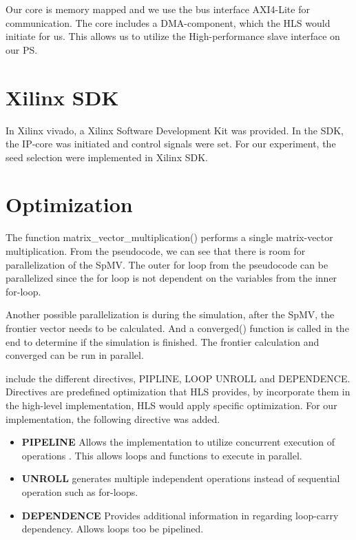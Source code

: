 Our core is memory mapped and we use the bus interface AXI4-Lite for communication. The core includes a DMA-component, which the HLS would initiate for us. This allows us to utilize the High-performance slave interface on our PS.


\section{Xilinx SDK}
In Xilinx vivado, a Xilinx Software Development Kit was provided. In the SDK, the IP-core was initiated and control signals were set. For our experiment, the seed selection were implemented in Xilinx SDK.



\section{Optimization}
The function matrix\_vector\_multiplication() performs a single matrix-vector multiplication. From the pseudocode, we can see that there is  room for parallelization of the SpMV. The outer for loop from the pseudocode can be parallelized since the for loop is not dependent on the variables from the inner for-loop. 

Another possible parallelization is during the simulation, after the SpMV, the frontier vector needs to be calculated. And a converged() function is called in the end to determine if the simulation is finished. The frontier calculation and converged can be run in parallel. 

include the different directives, PIPLINE, LOOP UNROLL and DEPENDENCE. Directives are predefined optimization that HLS provides, by incorporate them in the high-level implementation, HLS would apply specific optimization. For our implementation, the following directive was added.

\begin{itemize}
\item \textbf{PIPELINE} Allows the implementation to utilize concurrent execution of operations \citep{optiDirect}. This allows loops and functions to execute in parallel. 
\item \textbf{UNROLL} generates multiple independent operations instead of sequential operation such as for-loops.\citep{optiDirect}
\item \textbf{DEPENDENCE} Provides additional information in regarding loop-carry dependency. Allows loops too be pipelined.\citep{optiDirect}
\end{itemize}


